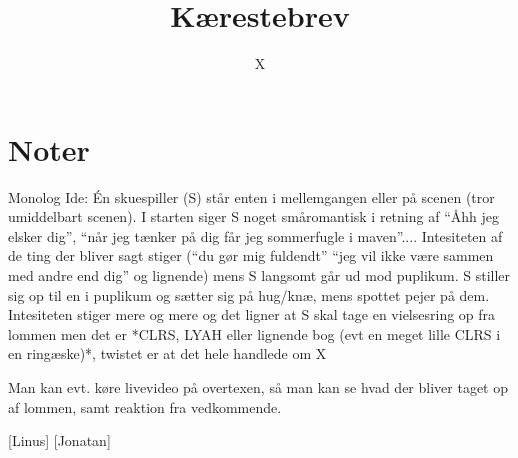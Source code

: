 \documentclass{article}
\title{Kærestebrev}
\author{X}
\begin{document}
                
\maketitle
\section*{Noter}       
Monolog
Ide: Én skuespiller (S) står enten i mellemgangen eller på scenen (tror umiddelbart scenen). I starten siger S noget småromantisk i retning af “Åhh jeg elsker dig”, “når jeg tænker på dig får jeg sommerfugle i maven”.... Intesiteten af de ting der bliver sagt stiger (“du gør mig fuldendt” “jeg vil ikke være sammen med andre end dig” og lignende) mens S langsomt går ud mod puplikum. S stiller sig op til en i puplikum og sætter sig på hug/knæ, mens spottet pejer på dem. Intesiteten stiger mere og mere og det ligner at S skal tage en vielsesring op fra lommen men det er *CLRS, LYAH eller lignende bog (evt en meget lille CLRS i en ringæske)*, twistet er at det hele handlede om X

Man kan evt. køre livevideo på overtexen, så man kan se hvad der bliver taget op af lommen, samt reaktion fra vedkommende.
\begin{roles}
[Linus]
 [Jonatan]
\end{roles}

\begin{props}

\prop{} 
\end{props}
\end{document}
